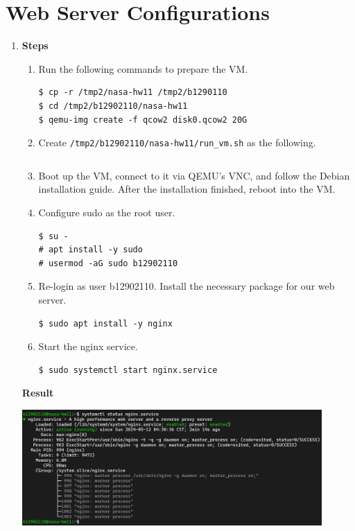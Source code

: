 \documentclass[12pt, a4paper]{article}
\begin{document}
  \section*{Web Server Configurations}
  \begin{enumerate}[resume]
    \item \textbf{Steps}
    \begin{enumerate}[label=(\arabic*)]
      \item Run the following commands to prepare the VM.
      \begin{Verbatim}[frame=single]
$ cp -r /tmp2/nasa-hw11 /tmp2/b1290110
$ cd /tmp2/b12902110/nasa-hw11
$ qemu-img create -f qcow2 disk0.qcow2 20G
      \end{Verbatim}
      \item Create \verb|/tmp2/b12902110/nasa-hw11/run_vm.sh| as the following.
      \inputminted[fontsize=\scriptsize]{shell}{run_vm.sh}
      \item Boot up the VM, connect to it via QEMU's VNC, and follow the Debian installation guide. After the installation finished, reboot into the VM.
      \item Configure sudo as the root user.
      \begin{Verbatim}[frame=single]
$ su -
# apt install -y sudo
# usermod -aG sudo b12902110
      \end{Verbatim}
      \item Re-login as user b12902110. Install the necessary package for our
      web server.
      \begin{Verbatim}[frame=single]
$ sudo apt install -y nginx
      \end{Verbatim}
      \item Start the nginx service.
      \begin{Verbatim}[frame=single]
$ sudo systemctl start nginx.service
      \end{Verbatim}
    \end{enumerate}

    \textbf{Result}

    \includegraphics[width=0.9\textwidth]{6_result.png}


\end{enumerate}
\end{document}
